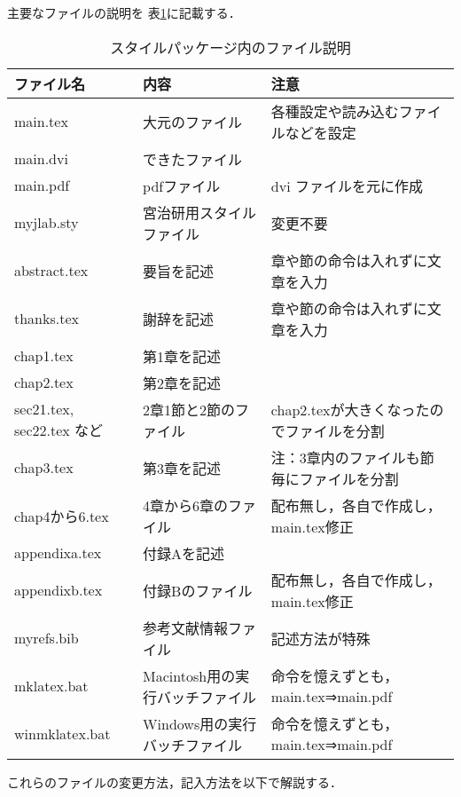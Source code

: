 主要なファイルの説明を 表\ref{table:files2}に記載する．
\begin{table}[H]
\begin{center}
\caption{スタイルパッケージ内のファイル説明}
\vspace{-2mm}
{\footnotesize
\begin{tabular}{|l|l|l|}
\hline
ファイル名 & 内容 & 注意\\\hline\hline
main.tex & 大元のファイル & 各種設定や読み込むファイルなどを設定\\\hline
main.dvi & できたファイル & \\\hline
main.pdf & pdfファイル & dvi ファイルを元に作成\\\hline
myjlab.sty & 宮治研用スタイルファイル & 変更不要\\\hline
abstract.tex & 要旨を記述 & 章や節の命令は入れずに文章を入力\\\hline
thanks.tex & 謝辞を記述 & 章や節の命令は入れずに文章を入力\\\hline
chap1.tex & 第1章を記述 & \\\hline
chap2.tex & 第2章を記述 & \\\hline
sec21.tex, sec22.tex など& 2章1節と2節のファイル & chap2.texが大きくなったのでファイルを分割\\\hline
chap3.tex & 第3章を記述 & 注：3章内のファイルも節毎にファイルを分割\\\hline
chap4から6.tex & 4章から6章のファイル & 配布無し，各自で作成し，main.tex修正\\\hline
appendixa.tex & 付録Aを記述 & \\\hline
appendixb.tex & 付録Bのファイル & 配布無し，各自で作成し，main.tex修正\\\hline
myrefs.bib & 参考文献情報ファイル & 記述方法が特殊\\\hline
mklatex.bat & Macintosh用の実行バッチファイル & 命令を憶えずとも，main.tex⇒main.pdf\\\hline
winmklatex.bat & Windows用の実行バッチファイル & 命令を憶えずとも，main.tex⇒main.pdf\\\hline
\end{tabular}
}
\label{table:files2}
\end{center}
\end{table}

これらのファイルの変更方法，記入方法を以下で解説する．


